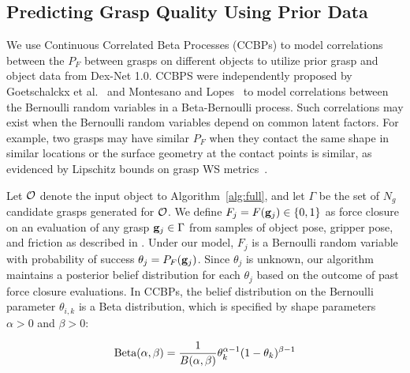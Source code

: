 \subsection{Predicting Grasp Quality Using Prior Data}
We use Continuous Correlated Beta Processes (CCBPs) to model correlations between the $P_F$ between grasps on different objects to utilize prior grasp and object data from Dex-Net 1.0.
CCBPS were independently proposed by Goetschalckx et al.~\cite{goetschalckx2011continuous} and Montesano and Lopes~\cite{montesano2012active} to model correlations between the Bernoulli random variables in a Beta-Bernoulli process.
Such correlations may exist when the Bernoulli random variables depend on common latent factors.
For example, two grasps may have similar $P_F$ when they contact the same shape in similar locations or the surface geometry at the contact points is similar, as evidenced by Lipschitz bounds on grasp WS metrics~\cite{pokorny2013c}.

Let $\mathcal{O}$ denote the input object to Algorithm~\ref{alg:full}, and let $\Gamma$ be the set of $N_g$ candidate grasps generated for $\mathcal{O}$.
We define $F_{j} = F(\mathbf{g}_{j}) \in \{0, 1\}$ as force closure on an evaluation of any grasp $\mathbf{g}_{j} \in \Gamma$ from samples of object pose, gripper pose, and friction as described in .
Under our model, $F_j$ is a Bernoulli random variable with probability of success $\theta_{j}= P_F(\mathbf{g}_{j})$.
Since $\theta_j$ is unknown, our algorithm maintains a posterior belief distribution for each $\theta_j$ based on the outcome of past force closure evaluations.
In CCBPs, the belief distribution on the Bernoulli parameter $\theta_{i,k}$ is a Beta distribution, which is specified by shape parameters $\alpha > 0$ and $\beta > 0$:

\vspace{-2ex}
\begin{align*}
	\text{Beta}(\alpha, \beta) = \frac{1}{B(\alpha, \beta)} \theta_k^{\alpha-1} (1 - \theta_k)^{\beta-1}
\end{align*}

